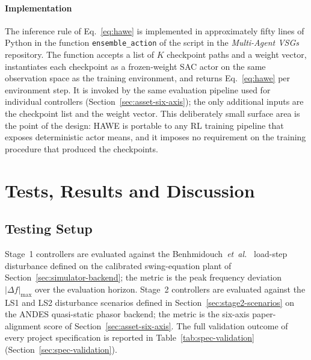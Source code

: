 \documentclass{unnc-fyp}
\begin{document}
\subsubsection{Implementation}

The inference rule of Eq.~\eqref{eq:hawe} is implemented in
approximately fifty lines of Python in the function
\verb|ensemble_action| of the script
 in the
\textit{Multi-Agent VSGs} repository.
The function accepts a list of $K$ checkpoint paths and a weight
vector, instantiates each checkpoint as a frozen-weight SAC actor
on the same observation space as the training environment, and
returns Eq.~\eqref{eq:hawe} per environment step.
It is invoked by the same evaluation pipeline used for individual
controllers (Section~\ref{sec:asset-six-axis}); the only
additional inputs are the checkpoint list and the weight vector.
This deliberately small surface area is the point of the design:
HAWE is portable to any RL training pipeline that exposes
deterministic actor means, and it imposes no requirement on the
training procedure that produced the checkpoints.

\chapter{Tests, Results and Discussion}
\label{ch:results}

\section{Testing Setup}

Stage~1 controllers are evaluated against the
Benhmidouch~\emph{et~al.}~\cite{benhmidouch2024td3} load-step
disturbance defined on the calibrated swing-equation plant of
Section~\ref{sec:simulator-backend}; the metric is the peak
frequency deviation $|\Delta f|_{\max}$ over the evaluation
horizon.
Stage~2 controllers are evaluated against the LS1 and LS2
disturbance scenarios defined in
Section~\ref{sec:stage2-scenarios} on the ANDES quasi-static
phasor backend; the metric is the six-axis paper-alignment
score of Section~\ref{sec:asset-six-axis}.
The full validation outcome of every project specification is
reported in Table~\ref{tab:spec-validation}
(Section~\ref{sec:spec-validation}).
\end{document}
